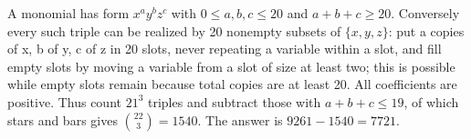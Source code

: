 A monomial has form $x^ay^bz^c$ with $0\le a,b,c\le 20$ and $a+b+c\ge 20$. Conversely every such triple can be realized by 20 nonempty subsets of $\{x,y,z\}$: put a copies of x, b of y, c of z in 20 slots, never repeating a variable within a slot, and fill empty slots by moving a variable from a slot of size at least two; this is possible while empty slots remain because total copies are at least 20. All coefficients are positive. Thus count $21^3$ triples and subtract those with $a+b+c\le 19$, of which stars and bars gives $\binom{22}{3}=1540$. The answer is $9261-1540=\boxed{7721}$.
